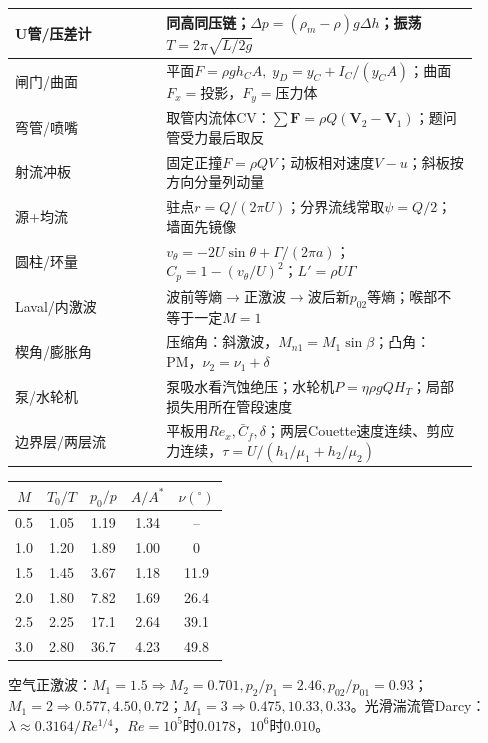 \renewcommand{\arraystretch}{0.67}\begin{tabular}{|p{0.30\linewidth}|p{0.62\linewidth}|}
\hline U管/压差计 & 同高同压链；$\Delta p=(\rho_m-\rho)g\Delta h$；振荡$T=2\pi\sqrt{L/2g}$\\ \hline
闸门/曲面 & 平面$F=\rho gh_CA,\;y_D=y_C+I_C/(y_CA)$；曲面$F_x=$投影，$F_y=$压力体\\ \hline
弯管/喷嘴 & 取管内流体CV：$\sum\bm F=\rho Q(\bm V_2-\bm V_1)$；题问管受力最后取反\\ \hline
射流冲板 & 固定正撞$F=\rho QV$；动板相对速度$V-u$；斜板按方向分量列动量\\ \hline
源+均流 & 驻点$r=Q/(2\pi U)$；分界流线常取$\psi=Q/2$；墙面先镜像\\ \hline
圆柱/环量 & $v_\theta=-2U\sin\theta+\Gamma/(2\pi a)$；$C_p=1-(v_\theta/U)^2$；$L'=\rho U\Gamma$\\ \hline
Laval/内激波 & 波前等熵$\to$正激波$\to$波后新$p_{02}$等熵；喉部不等于一定$M=1$\\ \hline
楔角/膨胀角 & 压缩角：斜激波，$M_{n1}=M_1\sin\beta$；凸角：PM，$\nu_2=\nu_1+\delta$\\ \hline
泵/水轮机 & 泵吸水看汽蚀绝压；水轮机$P=\eta\rho gQH_T$；局部损失用所在管段速度\\ \hline
边界层/两层流 & 平板用$Re_x,\bar C_f,\delta$；两层Couette速度连续、剪应力连续，$\tau=U/(h_1/\mu_1+h_2/\mu_2)$\\ \hline
\end{tabular}\renewcommand{\arraystretch}{1}

\renewcommand{\arraystretch}{0.66}\begin{tabular}{|c|c|c|c|c|}
\hline $M$&$T_0/T$&$p_0/p$&$A/A^*$&$\nu(^\circ)$\\ \hline
0.5&1.05&1.19&1.34&--\\ \hline
1.0&1.20&1.89&1.00&0\\ \hline
1.5&1.45&3.67&1.18&11.9\\ \hline
2.0&1.80&7.82&1.69&26.4\\ \hline
2.5&2.25&17.1&2.64&39.1\\ \hline
3.0&2.80&36.7&4.23&49.8\\ \hline
\end{tabular}\renewcommand{\arraystretch}{1}

空气正激波：$M_1=1.5\Rightarrow M_2=0.701,p_2/p_1=2.46,p_{02}/p_{01}=0.93$；$M_1=2\Rightarrow0.577,4.50,0.72$；$M_1=3\Rightarrow0.475,10.33,0.33$。光滑湍流管Darcy：$\lambda\approx0.3164/Re^{1/4}$，$Re=10^5$时$0.0178$，$10^6$时$0.010$。

